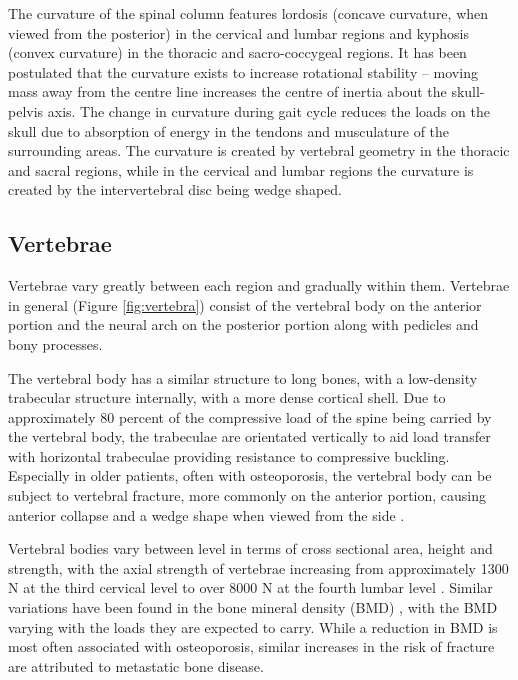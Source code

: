 The curvature of the spinal column features lordosis (concave curvature, when viewed from the posterior)
in the cervical and lumbar regions and kyphosis (convex curvature) in
the thoracic and sacro-coccygeal regions. It has been postulated that
the curvature exists to increase rotational stability -- moving mass
away from the centre line increases the centre of inertia about the
skull-pelvis axis. The change in curvature during gait cycle reduces the
loads on the skull due to absorption of energy in the tendons and
musculature of the surrounding areas. The curvature is created by
vertebral geometry in the thoracic and sacral regions, while in the
cervical and lumbar regions the curvature is created by the
intervertebral disc being wedge shaped.

\subsection{Vertebrae}\label{vertebrae}

Vertebrae vary greatly
between each
region
and gradually within
them.
Vertebrae in general (Figure \ref{fig:vertebra}) consist of the vertebral
body on the anterior
portion and the neural arch on the posterior portion along with pedicles
and bony processes.

The vertebral body has a similar structure to long bones, with a
low-density trabecular structure internally, with a more dense cortical
shell. Due to approximately 80 percent of the compressive load of the
spine being carried by the vertebral body, the trabeculae are orientated
vertically to aid load transfer with horizontal trabeculae providing
resistance to compressive buckling. Especially in older patients, often
with osteoporosis, the vertebral body can be subject to vertebral
fracture, more commonly on the anterior portion, causing anterior collapse and a wedge shape when viewed from the side \cite{Adams2005}.

Vertebral bodies vary between level in terms of cross sectional area,
height and strength, with the axial strength of vertebrae increasing
from approximately 1300 N at the third cervical level to over 8000 N at the fourth
lumbar level \cite{Stewart2006}. Similar variations have been found in the
bone
mineral density (BMD) \cite{yoganandan2006}, with the BMD varying
with
the loads
they
are expected to carry. While a reduction in BMD is most often associated
with osteoporosis, similar increases in the risk of fracture are
attributed to metastatic bone disease.

